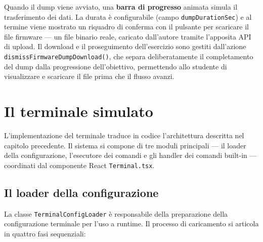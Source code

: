 
Quando il dump viene avviato, una \textbf{barra di progresso} animata simula il trasferimento dei dati. La durata è configurabile (campo \texttt{dumpDurationSec}) e al termine viene mostrato un riquadro di conferma con il pulsante per scaricare il file firmware --- un file binario reale, caricato dall'autore tramite l'apposita API di upload. Il download e il proseguimento dell'esercizio sono gestiti dall'azione \texttt{dismissFirmwareDumpDownload()}, che separa deliberatamente il completamento del dump dalla progressione dell'obiettivo, permettendo allo studente di visualizzare e scaricare il file prima che il flusso avanzi.


\section{Il terminale simulato}
\label{sec:terminale-simulato}

L'implementazione del terminale traduce in codice l'architettura descritta nel capitolo precedente. Il sistema si compone di tre moduli principali --- il loader della configurazione, l'esecutore dei comandi e gli handler dei comandi built-in --- coordinati dal componente React \texttt{Terminal.tsx}.

\subsection{Il loader della configurazione}

La classe \texttt{TerminalConfigLoader} è responsabile della preparazione della configurazione terminale per l'uso a runtime. Il processo di caricamento si articola in quattro fasi sequenziali:

